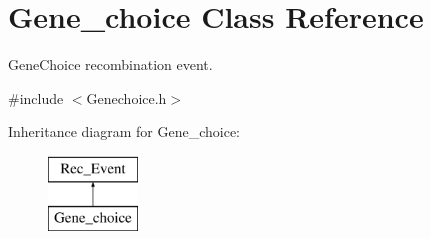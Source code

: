 \hypertarget{classGene__choice}{}\section{Gene\+\_\+choice Class Reference}
\label{classGene__choice}


Gene\+Choice recombination event.  




{\ttfamily \#include $<$Genechoice.\+h$>$}

Inheritance diagram for Gene\+\_\+choice\+:\begin{figure}[H]
\begin{center}
\leavevmode
\includegraphics[height=2.000000cm]{df/dae/classGene__choice}
\end{center}
\end{figure}
